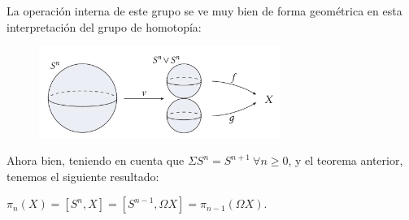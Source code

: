 La operación interna de este grupo se ve muy bien de forma geométrica en esta interpretación del grupo de homotopía: \par
\begin{figure}[h]
\centering
\includegraphics[width=0.7\textwidth]{images/ejgruphomot.pdf}
\end{figure}

Ahora bien, teniendo en cuenta que $\Sigma S^n = S^{n+1} \ \forall n \geq 0$, y el teorema anterior, tenemos el siguiente resultado:
\begin{teorf}
$\pi_n(X) = [S^n, X] = [S^{n-1}, \Omega X] = \pi_{n-1}(\Omega X)$.
\end{teorf}
\newpage
\mbox{}
\thispagestyle{empty}